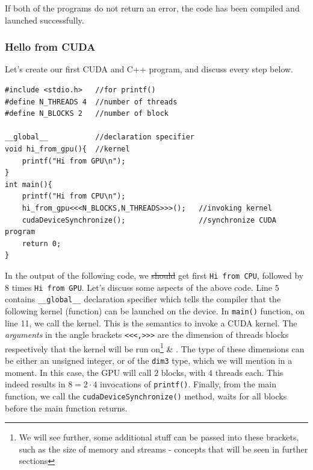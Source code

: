 \vspace{-0.4cm}
If both of the programs do not return an error, the code has been compiled and launched successfully.

\subsubsection{Hello from CUDA}
Let's create our first CUDA and C++ program, and discuss every step below. 
\begin{verbatim}
#include <stdio.h>   //for printf()
#define N_THREADS 4  //number of threads
#define N_BLOCKS 2   //number of block

__global__           //declaration specifier 
void hi_from_gpu(){  //kernel
    printf("Hi from GPU\n");
}
int main(){
    printf("Hi from CPU\n");
    hi_from_gpu<<<N_BLOCKS,N_THREADS>>>();   //invoking kernel
    cudaDeviceSynchronize();                 //synchronize CUDA program
    return 0;
}
\end{verbatim}

In the output of the following code, we \sout{should} get first \verb|Hi from CPU|, 
followed by 8 times \verb|Hi from GPU|. Let's discuss some aspects of the above code.
Line $5$ contains \verb|__global__| declaration specifier which tells 
the compiler that the following kernel (function) can be launched on the device.
In \verb|main()| function, on line 11, we call the kernel. This is the semantics to 
invoke a CUDA kernel. The \textit{arguments} in the angle brackets \verb|<<<,>>>| 
are the dimension of threads blocks respectively that the kernel will be run on\footnote{We will see further, some additional stuff can be passed
into these brackets, such as the size of memory and streams - concepts that will be seen in further sections
} \& . The type of these dimensions can be either an unsigned integer, or of the \verb|dim3| type, which we will mention in a moment. In this case, 
the GPU will call $2$ blocks, with $4$ threads each. This indeed results in 
$8 = 2\cdot 4$ invocations of \verb|printf()|. Finally, from the main function, we call 
the \verb|cudaDeviceSynchronize()| method, waits for all blocks before the main 
function returns.


